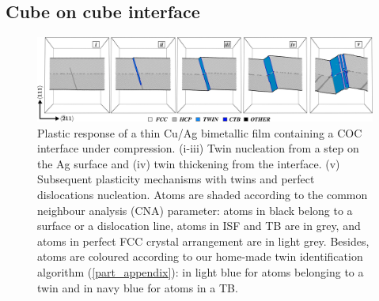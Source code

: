 \documentclass[final,3p,times,twocolumn]{elsarticle}
\begin{document}
 
	\subsection{Cube on cube interface}\label{subsubpart_sAg}

\begin{figure}[!t]
	\begin{center}
		\includegraphics[width=165mm]{Pic/fig_s1AgCOC.eps} 
	\end{center}
	\caption{Plastic response of a thin Cu/Ag bimetallic film containing a COC interface under compression. (i-iii) Twin nucleation from a step on the Ag surface and (iv) twin thickening from the interface. (v) Subsequent plasticity mechanisms with twins and perfect dislocations nucleation. Atoms are shaded according to the common neighbour analysis (CNA) parameter: atoms in black belong to a surface or a dislocation line, atoms in ISF and TB are in grey, and atoms in perfect FCC crystal arrangement are in light grey. Besides, atoms are coloured according to our home-made twin identification algorithm (\ref{part_appendix}): in light blue for atoms belonging to a twin and in navy blue for atoms in a TB.}\label{fig_s1AgCOC}
\end{figure}
\end{document}
